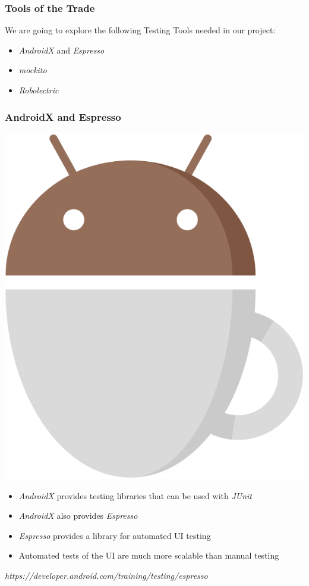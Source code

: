 \documentclass[10pt]{beamer}
\begin{document}
\begin{frame}
\frametitle{Tools of the Trade}
We are going to explore the following Testing Tools needed in our project:
\begin{itemize}
    \item \textit{AndroidX} and \textit{Espresso}
    \item \textit{mockito}
    \item \textit{Robolectric}
\end{itemize}
\end{frame}

\begin{frame}
    \frametitle{AndroidX and Espresso}
    \center\includegraphics[scale=0.15]{3rd_party/espresso}
    \begin{itemize}
        \item \textit{AndroidX} provides testing libraries that can be used with \textit{JUnit}
        \item \textit{AndroidX} also provides \textit{Espresso}
        \item \textit{Espresso} provides a library for automated UI testing
        \item Automated tests of the UI are much more scalable than manual testing
    \end{itemize}
    \tiny\emph{https://developer.android.com/training/testing/espresso}
\end{frame}
\end{document}
